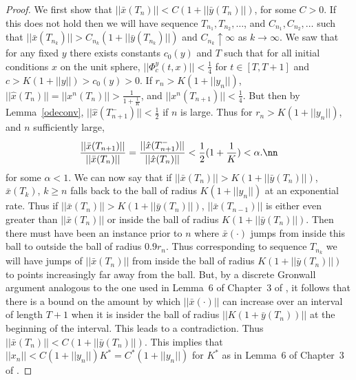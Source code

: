 \begin{proof}
We first show that $||\bar{x}(T_n)||<C(1+||\bar{y}(T_n)||)$, for some $C>0$. If this does not hold then we will have sequence $T_{n_1}, T_{n_2}, \ldots$, and $C_{n_1}, C_{n_2},\ldots$ such that $||\bar{x}(T_{n_k})||>C_{n_k}(1+||\bar{y}(T_{n_k})||)$ and $C_{n_k} \uparrow \infty$ as $k \rightarrow \infty$. We saw that for any fixed $y$ there exists constants $c_0(y)$ and $T$ such that for all initial conditions $x$ on the unit sphere, $||\Phi^y_c(t,x)||<\frac{1}{4}$ for $t \in [T,T+1]$ and $c>K(1+||y||)>c_0(y)>0$. If $r_n >K(1+||y_n||)$, $||\hat{x}(T_n)||=||x^n(T_n)||>\frac{1}{1+\frac{1}{K}}$, and $||x^n(T_{n+1})||<\frac{1}{4}$. But then by Lemma~\ref{odeconv}, $||\hat{x}(T^-_{n+1})||<\frac{1}{2}$ if $n$ is large. Thus for $r_n>K(1+||y_n||)$, and $n$ sufficiently large,
\begin{align}
\frac{||\bar{x}(T_{n+1})||}{||\bar{x}(T_n)||}=\frac{||\hat{x}(T^-_{n+1})||}{||\hat{x}(T_n)||}<\frac{1}{2}(1+\frac{1}{K})<\alpha.\nn
\end{align}
for some $\alpha<1$. We can now say that if $||\bar{x}(T_n)||>K(1+||\bar{y}(T_n)||)$, $\bar{x}(T_k)$, $k\geq n$ falls back to the ball of radius $K(1+||y_n||)$ at an exponential rate. Thus if $||\bar{x}(T_n)||>K(1+||\bar{y}(T_n)||)$, $||\bar{x}(T_{n-1})||$ is either even greater than $||\bar{x}(T_n)||$ or inside the ball of radius $K(1+||\bar{y}(T_n)||)$. Then there must have been an instance prior to $n$ where $\bar{x}(\cdot)$ jumps from inside this ball to outside the ball of radius $0.9 r_n$. Thus corresponding to sequence $T_{n_k}$ we will have jumps of $||\bar{x}(T_n)||$ from inside the ball of radius $K(1+||\bar{y}(T_n)||)$ to points increasingly far away from the ball. But, by a discrete Gronwall argument analogous to the one used in Lemma~$6$ of Chapter~$3$ of \cite{SA}, it follows that there is a bound on the amount by which $||\bar{x}(\cdot)||$ can increase over an interval of length $T+1$ when it is insider the ball of radius $||K(1+\bar{y}(T_n))||$ at the beginning of the interval. This leads to a contradiction. Thus $||\bar{x}(T_n)||<C(1+||\bar{y}(T_n)||)$. This implies that $||x_n||<C(1+||y_n||)K^*=C^*(1+||y_n||)$ for $K^*$ as in Lemma~$6$ of Chapter~$3$ of \cite{SA}.
\end{proof}
